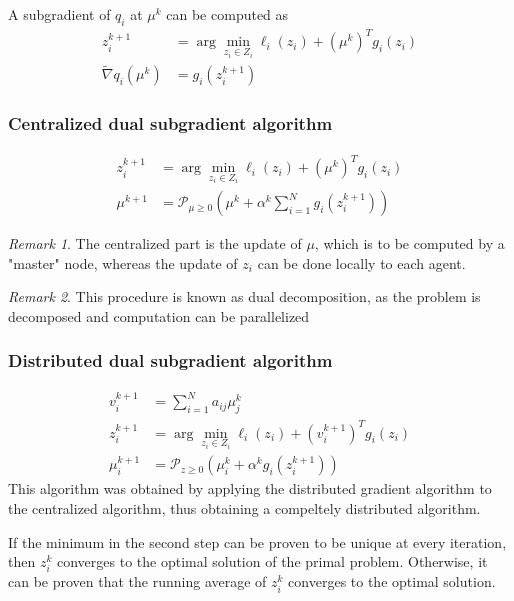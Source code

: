 \documentclass{book}
\theoremstyle{theoremv2}
\theoremstyle{defv2}
\theoremstyle{remark}
\newtheorem*{remark}{Remark}
\theoremstyle{remark}
\theoremstyle{definition}
\theoremstyle{definition}
\begin{document}
A subgradient of $q_i$ at $\mu^k$ can be computed as 
\begin{align*}
    z_i^{k+1} &= \arg \min_{z_i\in Z_i} \ell_i(z_i) + (\mu^k)^Tg_i(z_i)\\
    \tilde{\nabla} q_i(\mu^k) &= g_i(z_i^{k+1})
\end{align*}

\subsubsection{Centralized dual subgradient algorithm}
\begin{align*}
    z_i^{k+1} &= \arg \min_{z_i\in Z_i} \ell_i(z_i) + (\mu^k)^Tg_i(z_i)\\
    \mu^{k+1} &= \mathcal{P}_{\mu\geq 0}\left(\mu^k + \alpha^k \displaystyle\sum_{i=1}^{N}g_i(z_i^{k+1})\right)
\end{align*}
\begin{remark}
    The centralized part is the update of $\mu$, which is to be computed by a "master" node, whereas the update of $z_i$ can be done locally to each agent.
\end{remark}
\begin{remark}
    This procedure is known as dual decomposition, as the problem is decomposed and computation can be parallelized
\end{remark}

\subsubsection{Distributed dual subgradient algorithm}
\begin{align*}
    v_i^{k+1} &= \displaystyle\sum_{i=1}^{N}a_{ij}\mu_j^k \\ 
    z_i^{k+1} &= \arg\min_{z_i\in Z_i} \ell_i(z_i) + (v_i^{k+1})^Tg_i(z_i)\\
    \mu_i^{k+1} &= \mathcal{P}_{z\geq0} \left(\mu_i^k + \alpha^k g_i(z_i^{k+1})\right)
\end{align*}
This algorithm was obtained by applying the distributed gradient algorithm to the centralized algorithm, thus obtaining a compeltely distributed algorithm.

If the minimum in the second step can be proven to be unique at every iteration, then $z_i^k$ converges to the optimal solution of the primal problem. Otherwise, it can be proven that the running average of $z_i^k$ converges to the optimal solution.
\end{document}
